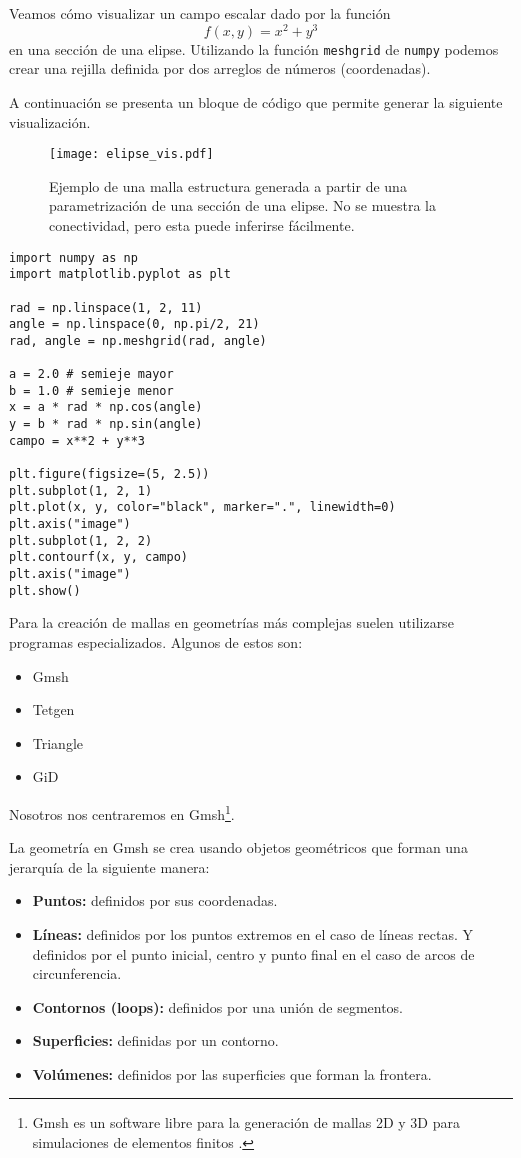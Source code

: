 Veamos cómo visualizar un campo escalar dado por la función
\[f(x, y) = x^2 + y^3\]
en una sección de una elipse. Utilizando la función \texttt{meshgrid} de \texttt{numpy} podemos crear una rejilla definida por dos arreglos de números (coordenadas).

A continuación se presenta un bloque de código que permite generar la siguiente visualización.
\begin{figure}[H]
    \centering
    \texttt{[image: elipse\_vis.pdf]}
    \caption{Ejemplo de una malla estructura generada a partir de una parametrización de una sección de una elipse. No se muestra la conectividad, pero esta puede inferirse fácilmente.}
\end{figure}

\pagebreak
\begin{verbatim}
import numpy as np
import matplotlib.pyplot as plt

rad = np.linspace(1, 2, 11)
angle = np.linspace(0, np.pi/2, 21)
rad, angle = np.meshgrid(rad, angle)

a = 2.0 # semieje mayor
b = 1.0 # semieje menor
x = a * rad * np.cos(angle)
y = b * rad * np.sin(angle)
campo = x**2 + y**3

plt.figure(figsize=(5, 2.5))
plt.subplot(1, 2, 1)
plt.plot(x, y, color="black", marker=".", linewidth=0)
plt.axis("image")
plt.subplot(1, 2, 2)
plt.contourf(x, y, campo)
plt.axis("image")
plt.show()
\end{verbatim}

Para la creación de mallas en geometrías más complejas suelen utilizarse programas especializados. Algunos de estos son:
\begin{itemize}
    \item Gmsh
    \item Tetgen
    \item Triangle
    \item GiD
\end{itemize}

Nosotros nos centraremos en Gmsh\footnote{Gmsh es un software libre para la 
generación de mallas 2D y 3D para simulaciones de elementos finitos 
\cite{gmsh}.}.

La geometría en Gmsh se crea usando objetos geométricos que forman una jerarquía de la siguiente manera:
\begin{itemize}
\item \textbf{Puntos:} definidos por sus coordenadas.

\item \textbf{Líneas:} definidos por los puntos extremos en el caso de líneas rectas. Y definidos por el punto inicial, centro y punto final en el caso de arcos de circunferencia.

\item \textbf{Contornos (loops):} definidos por una unión de segmentos.

\item \textbf{Superficies:} definidas por un contorno.

\item \textbf{Volúmenes:} definidos por las superficies que forman la frontera.
\end{itemize}

